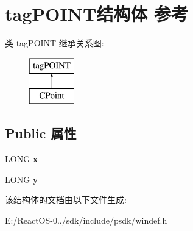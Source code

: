 \hypertarget{structtag_p_o_i_n_t}{}\section{tag\+P\+O\+I\+N\+T结构体 参考}
\label{structtag_p_o_i_n_t}
类 tag\+P\+O\+I\+NT 继承关系图\+:\begin{figure}[H]
\begin{center}
\leavevmode
\includegraphics[height=2.000000cm]{structtag_p_o_i_n_t}
\end{center}
\end{figure}
\subsection*{Public 属性}
\begin{DoxyCompactItemize}
\item 
\mbox{\label{structtag_p_o_i_n_t_a5dbdde7d3d1fd1d988c727f21ec988dc}} 
L\+O\+NG {\bfseries x}
\item 
\mbox{\label{structtag_p_o_i_n_t_a18cd752a8dcae000feac7bd103a8f87d}} 
L\+O\+NG {\bfseries y}
\end{DoxyCompactItemize}


该结构体的文档由以下文件生成\+:\begin{DoxyCompactItemize}
\item 
E\+:/\+React\+O\+S-\/0../sdk/include/psdk/windef.\+h\end{DoxyCompactItemize}
